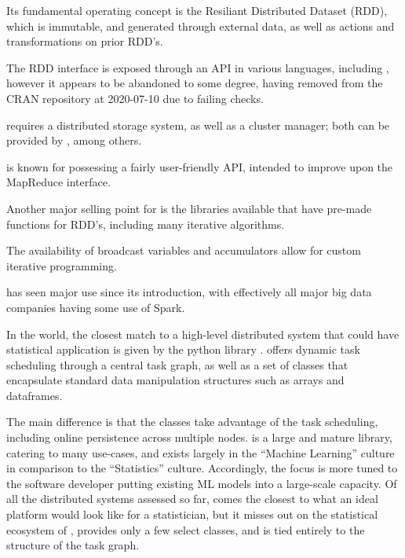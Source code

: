 Its fundamental operating concept is the Resiliant Distributed Dataset
(RDD), which is immutable, and generated through external data, as well
as actions and transformations on prior RDD's.

The RDD interface is exposed through an API in various languages,
including \R, however it appears to be abandoned to some degree, having
removed from the CRAN repository at 2020-07-10 due to failing checks.

 requires a distributed storage system, as well as a cluster
manager; both can be provided by , among others.

 is known for possessing a fairly user-friendly API, intended to
improve upon the MapReduce interface.

Another major selling point for  is the libraries available that
have pre-made functions for RDD's, including many iterative algorithms.

The availability of broadcast variables and accumulators allow for
custom iterative programming.

 has seen major use since its introduction, with effectively all
major big data companies having some use of Spark.

In the  world, the closest match to a high-level distributed
system that could have statistical application is given by the python
library \cite{rocklin2015dask}.  offers
dynamic task scheduling through a central task graph, as well as a set
of classes that encapsulate standard data manipulation structures such
as  arrays and  dataframes.

The main difference is that the  classes take advantage of
the task scheduling, including online persistence across multiple nodes.
 is a large and mature library, catering to many use-cases,
and exists largely in the  ``Machine Learning'' culture in
comparison to the \R ``Statistics'' culture. Accordingly, the focus is
more tuned to the  software developer putting existing ML models
into a large-scale capacity. Of all the distributed systems assessed so
far,  comes the closest to what an ideal platform would
look like for a statistician, but it misses out on the statistical
ecosystem of \R, provides only a few select classes, and is tied entirely
to the structure of the task graph.
